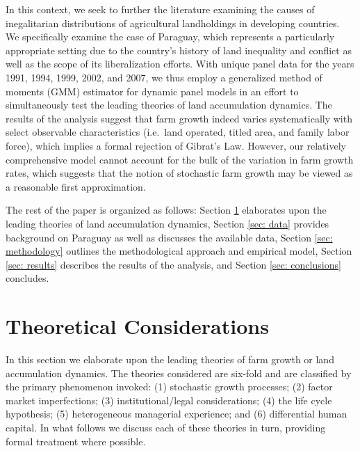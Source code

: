 \documentclass[english]{article}
\begin{document}
In this context, we seek to further the literature examining the causes of 
inegalitarian distributions of agricultural landholdings in developing 
countries.
We specifically examine the case of Paraguay, which represents a particularly 
appropriate setting due to the country's history of land inequality and conflict 
as well as the scope of its liberalization efforts.
With unique panel data for the years 1991, 1994, 1999, 2002, and 2007, we thus 
employ a generalized method of moments (GMM) estimator for dynamic panel 
models in an effort to simultaneously test the leading theories of land 
accumulation dynamics.
The results of the analysis suggest that farm growth indeed varies 
systematically with select observable characteristics 
(i.e.\ land operated, titled area, and family labor force), which implies a formal 
rejection of Gibrat's Law. 
However, our relatively comprehensive model cannot account for the bulk of 
the variation in farm growth rates, which suggests that the notion of 
stochastic farm growth may be viewed as a reasonable first approximation.

The rest of the paper is organized as follows: Section \ref{sec: theories} 
elaborates upon the leading theories of land accumulation dynamics, 
Section \ref{sec: data} provides background on Paraguay as well as discusses 
the available data, Section \ref{sec: methodology} outlines the methodological 
approach and empirical model, Section \ref{sec: results} describes the results 
of the analysis, and Section \ref{sec: conclusions} concludes.


\section{Theoretical Considerations}
\label{sec: theories}

In this section we elaborate upon the leading theories of farm growth or 
land accumulation dynamics.  
The theories considered are six-fold and are classified by the primary 
phenomenon invoked: (1) stochastic growth processes; 
(2) factor market imperfections; (3) institutional/legal considerations; 
(4) the life cycle hypothesis; (5) heterogeneous managerial experience; and 
(6) differential human capital. 
In what follows we discuss each of these theories in turn, providing formal
treatment where possible.
\end{document}
